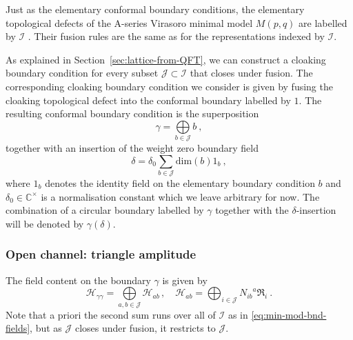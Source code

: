 \documentclass[11pt,a4paper]{article}
\numberwithin{equation}{section}
\begin{document}
Just as the elementary conformal boundary conditions, the elementary topological defects of the A-series Virasoro minimal model $M(p,q)$ are labelled by $\mathcal{I}$ \cite{Petkova:2000ip,Fuchs:2002cm}. Their fusion rules are the same as for the representations indexed by $\mathcal{I}$. 

As explained in Section~\ref{sec:lattice-from-QFT}, we can construct a cloaking boundary condition for every subset $\mathcal{J} \subset \mathcal{I}$ that closes under fusion. 
The corresponding cloaking boundary condition we consider is given by fusing the cloaking topological defect into the conformal boundary labelled by $1$. The resulting conformal boundary condition is the superposition
%
\begin{equation}
    \gamma = \bigoplus\limits_{b\in \mathcal{J}} b \ ,
\end{equation}
%
together with an insertion of the weight zero boundary field
%
\begin{equation}
    \delta = \delta_0\sum_{b \in \mathcal{J}} \text{dim}(b) 1_b \ , 
\end{equation}
where $1_b$ denotes the identity field on the elementary boundary condition $b$ and $\delta_0 \in \mathbb{C}^\times$ is a normalisation constant which we leave arbitrary for now. The combination of a circular boundary labelled by $\gamma$ together with the $\delta$-insertion will be denoted by $\gamma(\delta)$.

\subsubsection{Open channel: triangle amplitude} 

The field content on the boundary $\gamma$ is given by
%
\begin{equation}
    \mathcal{H}_{\gamma\gamma} = \bigoplus\limits_{a,b\in \mathcal{J}} \mathcal{H}_{ab}\,,\quad \mathcal{H}_{ab} = \bigoplus_{i\in \mathcal{J}} {N_{ib}}^a \mathfrak{R}_i \ .
\end{equation}
%
Note that a priori the second sum runs over all of $\mathcal{I}$ as in \eqref{eq:min-mod-bnd-fields}, but as $\mathcal{J}$ closes under fusion, it restricts to $\mathcal{J}$.
\end{document}
